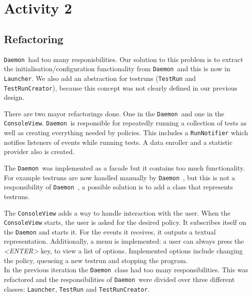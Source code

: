 \documentclass[i3]{oss}
\newcommand{\class}[1]{\texttt{#1}}
\newcommand{\Daemon}{\class{Daemon  }}
\begin{document}
\section{Activity 2}


\subsection{Refactoring}
\label{ss:refactoring}

\Daemon had too many responisbilities. Our solution to this problem is to extract the initialisation/configuration functionality from \Daemon and this is now in \class{Launcher}.
We also add an abstraction for testruns (\class{TestRun} and \class{TestRunCreator}), because this concept was not clearly defined in our previous design.

There are two mayor refactorings done. One in the \Daemon and one in the \class{ConsoleView}. \Daemon is responsible for repeatedly running a collection of tests as well as creating everything needed by policies.
This includes a \class{RunNotifier} which notifies listeners of events while running tests. A data enroller and a statistic provider also is created.

The \Daemon was implemented as a facade but it contains too much functionality.
For example testruns are now handled manually by \Daemon, but this is
not a responsibility of \Daemon, a possible solution is to add a class
that represents testruns.

The \class{ConsoleView} adds a way to handle interaction with the user. 
When the \class{ConsoleView} starts, the user is asked for the desired policy.
It subscribes itself on the \class{Daemon} and starts it. For the events it receives, it outputs a textual representation. 
Additionally, a menu is implemented: a user can always press the \emph{<ENTER>} key, to view a list of options. Implemented options include changing the policy, queueing a new testrun and stopping the program. \\


In the previous iteration the \Daemon class had too many responsibilities. 
This was refactored and the responsibilities of \Daemon were divided over three different classes: \class{Launcher}, \class{TestRun} and \class{TestRunCreator}.
\end{document}
